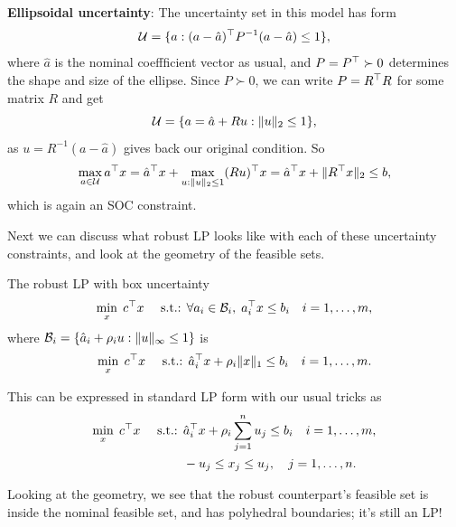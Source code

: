 \documentclass[11 pt]{scrartcl}
\begin{document}
\begin{itemize}
    \ii \textbf{Ellipsoidal uncertainty}: The uncertainty set in this model has form 
    \[ \mathcal U = \{a : (a-\hat{a})^\top P^{-1} (a-\hat{a}) \leq 1\}, \] 
    where $\hat{a}$ is the nominal coeffficient vector as usual, and $P = P^\top \succ 0$ determines the shape and size of the ellipse. 
    Since $P\succ 0$, we can write $P = R^\top R$ for some matrix $R$ and get 
    \[ \mathcal U = \{a = \hat{a} + Ru : \|u\|_2 \leq 1\},\] 
    as $u = R^{-1}(a-\hat{a})$ gives back our original condition. 
    So 
    \[ \max_{a\in \mathcal U} a^\top x = \hat{a}^\top x + \max_{u: \|u\|_2 \leq 1} (Ru)^\top x = \hat{a}^\top x + \|R^\top x \|_2 \leq b,\] 
    which is again an SOC constraint.
\end{itemize}

Next we can discuss what robust LP looks like with each of these uncertainty constraints, and look at the geometry of the feasible sets. 

The robust LP with box uncertainty 
\begin{align*}
    \min_x\; c^\top x \quad\text{ s.t.: } \forall a_i\in \mathcal B_i,\; a_i^\top x \leq b_i \quad i = 1,\dots, m,
\end{align*}
where $\mathcal B_i = \{\hat{a}_i + \rho_i u : \|u\|_\infty \leq 1\}$ is 
\begin{align*}
    \min_x\; c^\top x \quad\text{ s.t.: } \hat{a}_i^\top x + \rho_i\|x\|_1 \leq b_i \quad i = 1,\dots, m.
\end{align*}

This can be expressed in standard LP form with our usual tricks as 
\begin{align*}
    \min_x\; c^\top x \quad\text{ s.t.: } &\hat{a}_i^\top x + \rho_i\sum_{j=1}^n u_j \leq b_i \quad i = 1,\dots, m, \\
                                        & -u_j \leq x_j \leq u_j, \quad j = 1, \dots, n.
\end{align*}

Looking at the geometry, we see that the robust counterpart's feasible set is inside the nominal feasible set, and has polyhedral boundaries; it's still an LP! 
\end{document}
